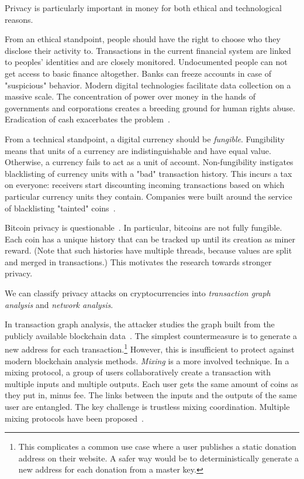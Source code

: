 Privacy is particularly important in money for both ethical and technological reasons.

From an ethical standpoint, people should have the right to choose who they disclose their activity to.
Transactions in the current financial system are linked to peoples' identities and are closely monitored.
Undocumented people can not get access to basic finance altogether.
Banks can freeze accounts in case of "suspicious" behavior.
Modern digital technologies facilitate data collection on a massive scale.
The concentration of power over money in the hands of governments and corporations creates a breeding ground for human rights abuse.
Eradication of cash exacerbates the problem~\cite{Brito2019}.

From a technical standpoint, a digital currency should be \textit{fungible}.
Fungibility means that units of a currency are indistinguishable and have equal value.
Otherwise, a currency fails to act as a unit of account.
Non-fungibility instigates blacklisting of currency units with a "bad" transaction history.
This incurs a tax on everyone: receivers start discounting incoming transactions based on which particular currency units they contain.
Companies were built around the service of blacklisting "tainted" coins~\cite{Elliptic, Chainalysis}.

Bitcoin privacy is questionable~\cite{Reid2011,Androulaki2013}.
In particular, bitcoins are not fully fungible.
Each coin has a unique history that can be tracked up until its creation as miner reward.
(Note that such histories have multiple threads, because values are split and merged in transactions.)
This motivates the research towards stronger privacy.

We can classify privacy attacks on cryptocurrencies into \textit{transaction graph analysis} and \textit{network analysis}.

In transaction graph analysis, the attacker studies the graph built from the publicly available blockchain data~\cite{Meiklejohn2013, Ober2013, Ron2013}.
The simplest countermeasure is to generate a new address for each transaction.\footnote{This complicates a common use case where a user publishes a static donation address on their website. A safer way would be to deterministically generate a new address for each donation from a master key.}
However, this is insufficient to protect against modern blockchain analysis methods.
\textit{Mixing} is a more involved technique.
In a mixing protocol, a group of users collaboratively create a transaction with multiple inputs and multiple outputs.
Each user gets the same amount of coins as they put in, minus fee.
The links between the inputs and the outputs of the same user are entangled.
The key challenge is trustless mixing coordination.
Multiple mixing protocols have been proposed~\cite{Maxwell2013, Bonneau2014, Ruffing2014, Valenta2015}.

